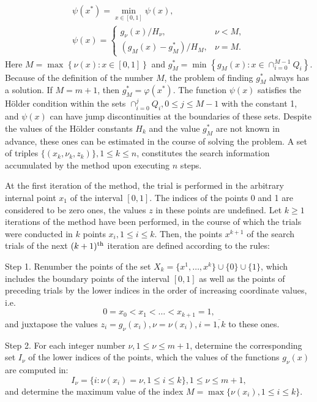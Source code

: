 \documentclass[runningheads]{llncs}
\begin{document}
\begin{displaymath}
  \begin{array}{lr}
    \psi (x^{*})=\min_{x\in [0,1]}\psi (x), \\
    \psi (x)={\begin{cases}g_{\nu }(x)/H_{\nu },&\nu <M,\\(g_{M}(x)-g_{M}^{*})/H_{M},&\nu
=M.\end{cases}}
  \end{array}
\end{displaymath}
Here \(M=\max_{}^{}\left\{\nu (x):x\in [0,1]\right\}\) and \(g_{M}^{*}=\min
_{}^{}\left\{g_{M}(x):x\in \cap _{i=0}^{M-1}Q_{i}\right\}\).
Because of the definition of the number \(M\), the problem of finding \(g_{M}^{*}\) always
has a solution. If \(M=m+1\), then \(g_{M}^{*}=\varphi(x^{*})\).
The function \(\psi (x)\) satisfies the H\"{o}lder condition within the sets
\(\cap _{i=0}^{j}Q_{i},0\leq j\leq M-1\)
with the constant 1, and \(\psi (x)\) can have jump discontinuities at the boundaries
of these sets.
Despite the values of the H\"{o}lder constants \(H_k\) and the value \(g_{M}^{*}\) are not
known in advance, these ones can be estimated in the course of solving the problem.
A set of triples \(\{(x_k,\nu_k,z_k)\}, 1\leqslant k\leqslant n\), constitutes the search information
accumulated by the method upon executing \(n\) steps.

At the first iteration of the method, the trial is performed in the arbitrary internal point \(x_1\) of
the interval \([0,1]\).
The indices of the points 0 and 1 are considered to be zero ones, the values \(z\) in these points
are undefined.
Let \(k\geqslant 1\) iterations of the method have been performed, in the course of which the
trials were conducted in \(k\) points \(x_i, 1\leqslant i\leqslant k\).
Then, the points \(x^{k+1}\) of the search trials of the next \((k+1)^{\rm th}\) iteration are
defined according to the rules:

Step 1. Renumber the points of the set \(X_k=\{x^1,\dotsc,x^k\}\cup\{0\}\cup\{1\}\), which
includes the boundary points of the interval \([0,1]\) as well as the points of preceding trials by
the lower indices in the order of increasing coordinate values, i.e.
\begin{equation}
  \label{eq:points}
  0=x_0<x_1<\dotsc<x_{k+1}=1,
\end{equation}
and juxtapose the values \(z_{i}=g_{\nu }(x_{i}),\nu =\nu (x_{i}),i={\overline {1,k}}\) to these
ones.

Step 2. For each integer number \(\nu ,1\leqslant \nu \leqslant m+1\), determine the corresponding
set \(I_{\nu }\) of the lower indices of the points, which the values of the functions \(g_{\nu
}(x)\) are computed in:
\begin{displaymath}
  I_{\nu }=\{i:\nu (x_{i})=\nu ,1\leqslant i\leqslant k\},1\leq \nu \leqslant m+1,
\end{displaymath}
and determine the maximum value of the index \(M=\max\{\nu (x_{i}),1\leq i\leq k\}\).
\end{document}

